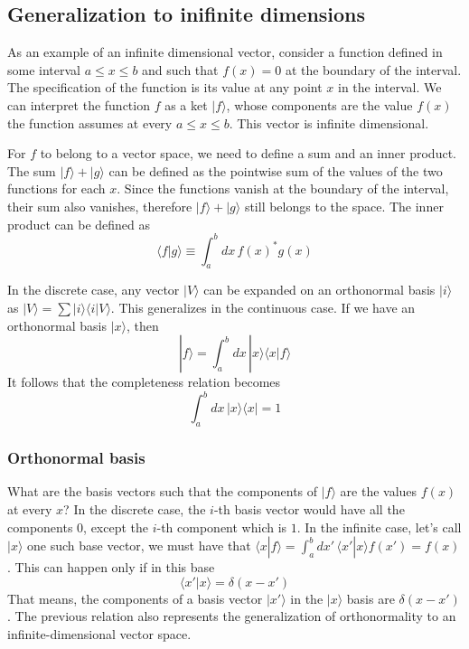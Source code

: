 \documentclass[11pt,fleqn]{book} %
\newcommand{\bra}[1]{\langle #1|}
\newcommand{\ket}[1]{| #1\rangle}
\newcommand{\scalar}[2]{\langle #1| #2\rangle}
\begin{document}
\subsection{Generalization to inifinite dimensions}
As an example of an infinite dimensional vector, consider a function defined in some interval $a\leq x\leq b$ and such that $f(x)=0$ at the 
boundary of the interval. The specification of the function is its value at any point $x$ in the interval. We can interpret the function $f$ 
as a ket $\ket{f}$, whose components are the value $f(x)$ the function assumes at every $a\leq x\leq b$. This vector is infinite dimensional. 

For $f$ to belong to a vector space, we need to define a sum and an inner product. The sum $\ket{f} + \ket{g}$ can be defined as the pointwise 
sum of the values of the two functions for each $x$. Since the functions vanish at the boundary of the interval, their sum also vanishes, therefore
$\ket{f} + \ket{g}$ still belongs to the space.
The inner product can be defined as
\begin{equation*}
    \scalar{f}{g}\equiv\int_a^b\!dx\, f(x)^*g(x)
\end{equation*}

In the discrete case, any vector $\ket{V}$ can be expanded on an orthonormal basis $\ket{i}$ as $\ket{V} = \sum \ket{i}\scalar{i}{V}$.
This generalizes in the continuous case. If we have an orthonormal basis $\ket{x}$, then
\begin{equation*}
    \ket{f} = \int_a^b\!dx\,\ket{x}\scalar{x}{f}
\end{equation*}
It follows that the completeness relation becomes
\begin{equation*}
    \int_a^b\!dx\,\ket{x}\bra{x}=1
\end{equation*}

\subsubsection{Orthonormal basis}
What are the basis vectors such that the components of $\ket{f}$ are the values $f(x)$ at every $x$? In the discrete case, the $i$-th basis vector would have
all the components $0$, except the $i$-th component which is $1$. In the infinite case, let's call $\ket{x}$ one such base vector,
we must have that $\scalar{x}{f}=\int_a^b\!dx'\, \scalar{x'}{x}f(x') = f(x)$. This can happen only if in this base 
\begin{equation*}
    \scalar{x'}{x} = \delta(x-x')    
\end{equation*}
That means, the components of a basis vector $\ket{x'}$ in the $\ket{x}$ basis are $\delta(x-x')$. The previous relation also represents the generalization of 
orthonormality to an infinite-dimensional vector space.
\end{document}

